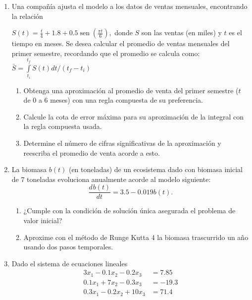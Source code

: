 \documentclass[12pt]{article}
\renewcommand{\sin}{\operatorname{sen}}
\newcommand{\diff}[3]{\frac{d^{#3} #1}{d#2^{#3}}}
\begin{document}
\vspace{-.5cm}
  \begin{enumerate}[leftmargin=*,widest=9]

    \item Una compañía ajusta el modelo a los datos de ventas mensuales, encontrando la relación

    \( S(t)= \frac{t}{4}+1.8+0.5\sin\left( \frac{\pi t}{6} \right),
    \)
    donde \(S\) son las ventas (en miles) y \(t\) es el tiempo en meses. Se desea calcular el promedio de ventas mensuales del primer semestre, recordando que el promedio se calcula como:
    \(
    \bar{S} = \int\limits_{t_i}^{t_f}S(t)dt /(t_f - t_i)
    \)

    \begin{enumerate}[label=\alph*]
    \item Obtenga una aproximación al promedio de venta del primer semestre (\(t\) de 0 a 6 meses) con una regla compuesta de su preferencia.

    \item Calcule la cota de error máxima para su aproximación de la integral con la regla compuesta usada.

    \item Determine el número de cifras significativas de la aproximación y reescriba el promedio de venta acorde a esto.

    \end{enumerate}

    \item La biomasa \(b(t)\) (en toneladas) de un ecosistema dado con biomasa inicial de 7 toneladas evoluciona anualmente acorde al modelo siguiente:
    \[
\diff{b(t)}{t}{} = 3.5 - 0.019b(t).
    \]

    \begin{enumerate}[label=\alph*]
    \item ¿Cumple con la condición de solución única asegurada el problema de valor inicial?

    \item Aproxime con el método de Runge Kutta 4 la biomasa trascurrido un año usando dos pasos temporales.

\end{enumerate}
   \item Dado el sistema de ecuaciones lineales
   \begin{align*}
   3x_1 - 0.1x_2 - 0.2x_3 & = 7.85 \\
   0.1x_1 + 7x_2 - 0.3x_3 & = -19.3 \\
   0.3x_1 - 0.2x_2 + 10x_3 & = 71.4
   \end{align*}


\end{enumerate}
\end{document}
